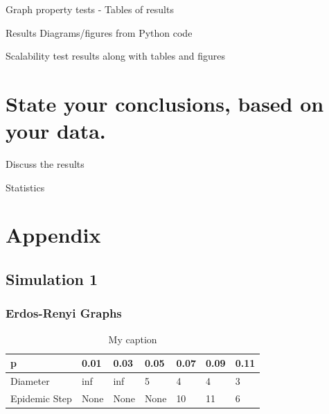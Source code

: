 \documentclass[a4paper,11pt]{article}
\begin{document}
Graph property tests - Tables of results

Results Diagrams/figures from Python code


Scalability  test results along with tables and figures


\section{State your conclusions, based on your data.}

Discuss the results


Statistics

\section*{Appendix}
\subsection*{Simulation 1}
\subsubsection*{Erdos-Renyi Graphs}

\begin{table}[h]
\centering
\caption{My caption}
\label{my-label}
\begin{tabular}{|l|l|l|l|l|l|l|}
\hline
p             & 0.01 & 0.03 & 0.05 & 0.07 & 0.09 & 0.11 \\ \hline
Diameter      & inf  & inf  & 5    & 4    & 4    & 3    \\ \hline
Epidemic Step & None & None & None & 10   & 11   & 6    \\ \hline
\end{tabular}
\end{table}
\clearpage



\end{document}
